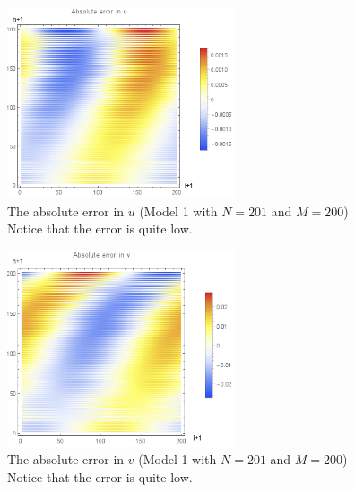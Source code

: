 \documentclass{article}
\renewcommand{\(}{\left(}
\renewcommand{\)}{\right)}
\begin{document}
\begin{figure}
\centering
\includegraphics[width=0.6\textwidth]{errorUneat201x200.png}
\caption{The absolute error in $u$ (Model 1 with $N=201$ and $M=200$)\\Notice that the error is quite low.}
\label{fig:uerr1big}
\end{figure}

\begin{figure}
\centering
\includegraphics[width=0.6\textwidth]{errorVneat201x200.png}
\caption{The absolute error in $v$ (Model 1 with $N=201$ and $M=200$)\\Notice that the error is quite low.}
\label{fig:verr1big}
\end{figure}

\clearpage
\end{document}
